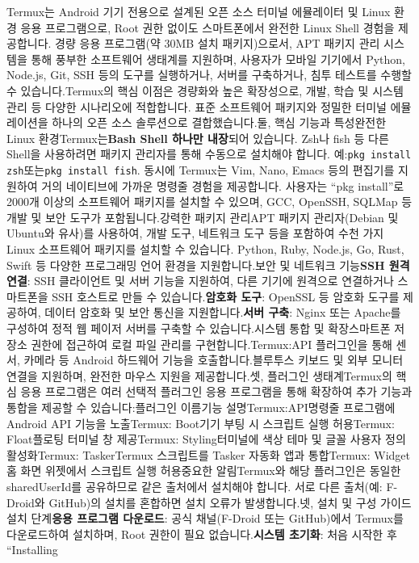 


Termux는 Android 기기 전용으로 설계된 오픈 소스 터미널 에뮬레이터 및 Linux 환경 응용 프로그램으로, Root 권한 없이도 스마트폰에서 완전한 Linux Shell 경험을 제공합니다. 경량 응용 프로그램(약 30MB 설치 패키지)으로서, APT 패키지 관리 시스템을 통해 풍부한 소프트웨어 생태계를 지원하며, 사용자가 모바일 기기에서 Python, Node.js, Git, SSH 등의 도구를 실행하거나, 서버를 구축하거나, 침투 테스트를 수행할 수 있습니다.Termux의 핵심 이점은 경량화와 높은 확장성으로, 개발, 학습 및 시스템 관리 등 다양한 시나리오에 적합합니다. 표준 소프트웨어 패키지와 정밀한 터미널 에뮬레이션을 하나의 오픈 소스 솔루션으로 결합했습니다.둘, 핵심 기능과 특성완전한 Linux 환경Termux는\textbf{Bash Shell 하나만 내장}되어 있습니다. Zsh나 fish 등 다른 Shell을 사용하려면 패키지 관리자를 통해 수동으로 설치해야 합니다. 예:\texttt{pkg install zsh}또는\texttt{pkg install fish}. 동시에 Termux는 Vim, Nano, Emacs 등의 편집기를 지원하여 거의 네이티브에 가까운 명령줄 경험을 제공합니다. 사용자는 “pkg install”로 2000개 이상의 소프트웨어 패키지를 설치할 수 있으며, GCC, OpenSSH, SQLMap 등 개발 및 보안 도구가 포함됩니다.강력한 패키지 관리APT 패키지 관리자(Debian 및 Ubuntu와 유사)를 사용하여, 개발 도구, 네트워크 도구 등을 포함하여 수천 가지 Linux 소프트웨어 패키지를 설치할 수 있습니다. Python, Ruby, Node.js, Go, Rust, Swift 등 다양한 프로그래밍 언어 환경을 지원합니다.보안 및 네트워크 기능\textbf{SSH 원격 연결}: SSH 클라이언트 및 서버 기능을 지원하여, 다른 기기에 원격으로 연결하거나 스마트폰을 SSH 호스트로 만들 수 있습니다.\textbf{암호화 도구}: OpenSSL 등 암호화 도구를 제공하여, 데이터 암호화 및 보안 통신을 지원합니다.\textbf{서버 구축}: Nginx 또는 Apache를 구성하여 정적 웹 페이저 서버를 구축할 수 있습니다.시스템 통합 및 확장스마트폰 저장소 권한에 접근하여 로컬 파일 관리를 구현합니다.Termux:API 플러그인을 통해 센서, 카메라 등 Android 하드웨어 기능을 호출합니다.블루투스 키보드 및 외부 모니터 연결을 지원하며, 완전한 마우스 지원을 제공합니다.셋, 플러그인 생태계Termux의 핵심 응용 프로그램은 여러 선택적 플러그인 응용 프로그램을 통해 확장하여 추가 기능과 통합을 제공할 수 있습니다:플러그인 이름기능 설명Termux:API명령줄 프로그램에 Android API 기능을 노출Termux: Boot기기 부팅 시 스크립트 실행 허용Termux: Float플로팅 터미널 창 제공Termux: Styling터미널에 색상 테마 및 글꼴 사용자 정의 활성화Termux: TaskerTermux 스크립트를 Tasker 자동화 앱과 통합Termux: Widget홈 화면 위젯에서 스크립트 실행 허용중요한 알림Termux와 해당 플러그인은 동일한 sharedUserId를 공유하므로 같은 출처에서 설치해야 합니다. 서로 다른 출처(예: F-Droid와 GitHub)의 설치를 혼합하면 설치 오류가 발생합니다.넷, 설치 및 구성 가이드설치 단계\textbf{응용 프로그램 다운로드}: 공식 채널(F-Droid 또는 GitHub)에서 Termux를 다운로드하여 설치하며, Root 권한이 필요 없습니다.\textbf{시스템 초기화}: 처음 시작한 후 “Installing 